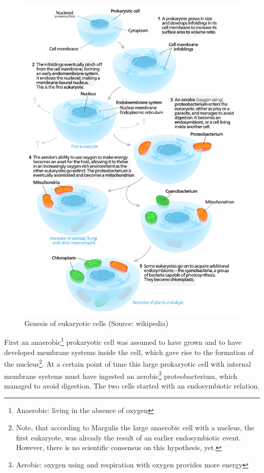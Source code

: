 \documentclass[
  11pt,
]{book}
\begin{document}
\begin{figure}

{\centering \includegraphics[width=0.8\linewidth]{./figs/endosymbiosis} 

}

\caption{Genesis of eukaryotic cells (Source: wikipedia)}\label{fig:endosymbiosis}
\end{figure}

First an anaerobic\footnote{Anaerobic: living in the absence of oxygen} prokaryotic cell was assumed to have grown and to have developed membrane systems inside the cell, which gave rise to the formation of the nucleus\footnote{Note, that according to Margulis the large anaerobic cell with a nucleus, the first eukaryote, was already the result of an earlier endosymbiotic event. However, there is no scientific consensus on this hypothesis, yet.}.
At a certain point of time this large prokaryotic cell with internal membrane systems must have ingested an aerobic\footnote{Aerobic: oxygen using and respiration with oxygen provides more energy} proteobacterium, which managed to avoid digestion. The two cells started with an endosymbiotic relation.
\end{document}
